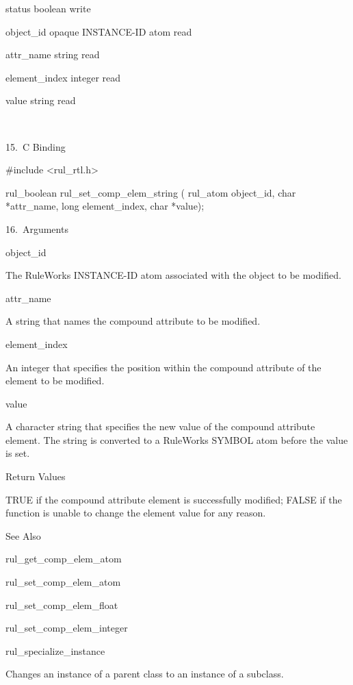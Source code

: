 {          status  boolean     write

          object_id  opaque INSTANCE-ID atom
           read

          attr_name  string     read

          element_index  integer     read

          value  string     read

           

      15. C Binding

          #include <rul_rtl.h>

          rul_boolean rul_set_comp_elem_string
          (
          rul_atom object_id,
          char *attr_name,
          long element_index,
          char *value);

      16. Arguments

          object_id

          The RuleWorks INSTANCE-ID atom
          associated with the object to be
          modified.

          attr_name

          A string that names the compound
          attribute to be modified.

          element_index

          An integer that specifies the
          position within the compound
          attribute of the element to be
          modified.

          value

          A character string that specifies
          the new value of the compound
          attribute element. The string is
          converted to a RuleWorks SYMBOL atom
          before the value is set.

          Return Values

          TRUE if the compound attribute
          element is successfully modified;
          FALSE if the function is unable to
          change the element value for any
          reason.

          See Also

          rul_get_comp_elem_atom

          rul_set_comp_elem_atom

          rul_set_comp_elem_float

          rul_set_comp_elem_integer

          rul_specialize_instance

          Changes an instance of a parent
          class to an instance of a subclass.

}
